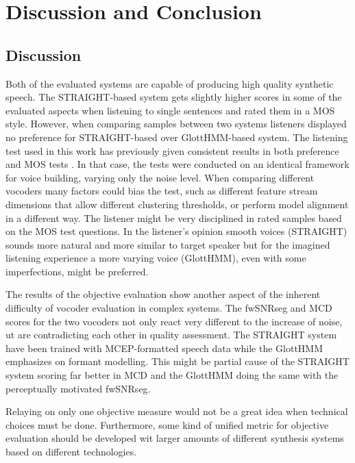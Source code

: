 \section{Discussion and Conclusion}
\label{conclusions}

\subsection{Discussion}
\label{conclusions_discussion}
Both of the evaluated systems are capable of producing high quality synthetic speech.
%
The STRAIGHT-based system gets slightly higher scores in some of the evaluated aspects when listening to single sentences and rated them in a MOS style. 
%
However, when comparing samples between two systems listeners displayed no preference for STRAIGHT-based over GlottHMM-based system.
%
The listening test used in this work has previously given consistent results in both preference and MOS tests \cite{karhila_jstsp_14}.
%
In that case, the tests were conducted on an identical framework for voice building, varying only the noise level.
%
When comparing different vocoders many factors could bias the test, such as different feature stream dimensions that allow different clustering thresholds, or perform model alignment in a different way.
%
The listener might be very disciplined in rated samples based on the MOS test questions.
%
In the listener's opinion smooth voices (STRAIGHT) sounds more natural and more similar to target speaker but for the imagined listening experience a more varying voice (GlottHMM), even with some imperfections, might be preferred.

The results of the objective evaluation show another aspect of the inherent difficulty of vocoder evaluation in complex systems.
%
The fwSNRseg and MCD scores for the two vocoders not only react very different to the increase of noise, ut are contradicting each other in quality assessment.
%
The STRAIGHT system have been trained with MCEP-formatted speech data while the GlottHMM emphasizes on formant modelling.
%
This might be partial cause of the STRAIGHT system scoring far better in MCD and the GlottHMM doing the same with the perceptually motivated fwSNRseg.

Relaying on only one objective measure would not be a great idea when technical choices must be done.
%
Furthermore, some kind of unified metric for objective evaluation should be developed wit larger amounts of different synthesis systems based on different technologies.

